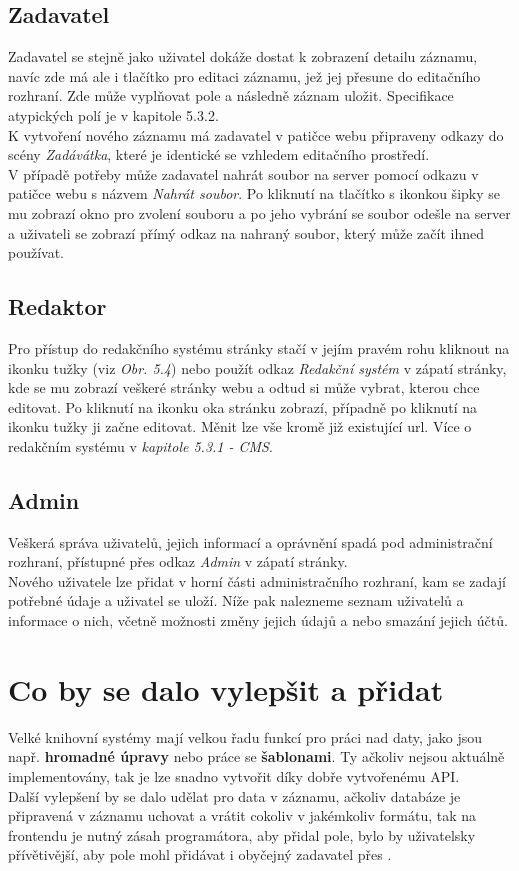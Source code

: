 \subsection{Zadavatel}
Zadavatel se stejně jako uživatel dokáže dostat k zobrazení detailu záznamu, navíc zde má
ale i tlačítko pro editaci záznamu, jež jej přesune do editačního rozhraní.
Zde může vyplňovat pole a následně záznam uložit. Specifikace atypických polí
je v kapitole 5.3.2.\\
K vytvoření nového záznamu má zadavatel v patičce webu připraveny odkazy do
scény \textit{Zadávátka}, které je identické se vzhledem editačního prostředí.\\
V případě potřeby může zadavatel nahrát soubor na server pomocí odkazu v
patičce webu s názvem \textit{Nahrát soubor}. Po kliknutí na tlačítko
s ikonkou šipky se mu zobrazí okno pro zvolení souboru a po jeho vybrání se
soubor odešle na server a uživateli se zobrazí přímý odkaz na nahraný soubor, který
může začít ihned používat.

\subsection{Redaktor}
Pro přístup do redakčního systému stránky stačí v jejím pravém rohu kliknout
na ikonku tužky (viz \textit{Obr. 5.4}) nebo použít odkaz \textit{Redakční systém}
v zápatí stránky, kde se mu zobrazí veškeré stránky webu a odtud si může vybrat,
kterou chce editovat. Po kliknutí na ikonku oka stránku zobrazí, případně po
kliknutí na ikonku tužky ji začne editovat. Měnit lze vše kromě již existující
url. Více o redakčním systému v \textit{kapitole 5.3.1 - CMS}.


\subsection{Admin}
Veškerá správa uživatelů, jejich informací a oprávnění spadá pod administrační rozhraní,
přístupné přes odkaz \textit{Admin} v zápatí stránky.\\
Nového uživatele lze přidat v horní části administračního rozhraní, kam se
zadají potřebné údaje a uživatel se uloží. Níže pak nalezneme seznam uživatelů a
informace o nich, včetně možnosti změny jejich údajů a nebo smazání jejich účtů.

\section{Co by se dalo vylepšit a přidat}
Velké knihovní systémy mají velkou řadu funkcí pro práci nad daty, jako jsou
např. \textbf{hromadné úpravy} nebo práce se \textbf{šablonami}. Ty ačkoliv
nejsou aktuálně implementovány, tak je lze snadno vytvořit díky
dobře vytvořenému API.\\
Další vylepšení by se dalo udělat pro data v záznamu, ačkoliv databáze
je připravená v záznamu uchovat a vrátit cokoliv v jakémkoliv formátu,
tak na frontendu je nutný zásah programátora, aby přidal pole, bylo by
uživatelsky přívětivější, aby pole mohl přidávat i obyčejný zadavatel
přes .

